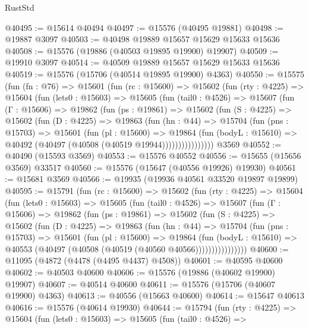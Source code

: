 \begin{lexlean}{RustStd}
\begin{coremodule}
@40495 := @15614 @40494
@40497 := @15576 (@40495 @19881)
@40498 := @19887 @3097
@40503 := @40498 @19889 @15657 @15629 @15633 @15636
@40508 := @15576 (@19886 (@40503 @19895 @19900) @19907)
@40509 := @19910 @3097
@40514 := @40509 @19889 @15657 @15629 @15633 @15636
@40519 := @15576 (@15706 (@40514 @19895 @19900) @4363)
@40550 := @15575
    (fun (fn : @76) =>
    @15601
      (fun (rc : @15600) =>
      @15602
        (fun (rty : @4225) =>
        @15604
          (fun (lets0 : @15603) =>
          @15605
            (fun (tail0 : @4526) =>
            @15607
              (fun (Γ : @15606) =>
              @19862
                (fun (ps : @19861) =>
                @15602
                  (fun (S : @4225) =>
                  @15602
                    (fun (D : @4225) =>
                    @19863
                      (fun (hn : @44) =>
                      @15704
                        (fun (pns : @15703) =>
                        @15601
                          (fun (pl : @15600) =>
                          @19864
                            (fun (bodyL : @15610) =>
                            @40492 (@40497 (@40508 (@40519 @19944))))))))))))))))
    @3569
@40552 := @40490 (@15593 @3569)
@40553 := @15576 @40552
@40556 := @15655 (@15656 @3569) @33517
@40560 := @15576 (@15647 (@40556 @19926) @19930)
@40561 := @15681 @3569
@40566 := @19935 (@19936 @40561 @33520 @19897 @19899)
@40595 := @15791
    (fun (rc : @15600) =>
    @15602
      (fun (rty : @4225) =>
      @15604
        (fun (lets0 : @15603) =>
        @15605
          (fun (tail0 : @4526) =>
          @15607
            (fun (Γ : @15606) =>
            @19862
              (fun (ps : @19861) =>
              @15602
                (fun (S : @4225) =>
                @15602
                  (fun (D : @4225) =>
                  @19863
                    (fun (hn : @44) =>
                    @15704
                      (fun (pns : @15703) =>
                      @15601
                        (fun (pl : @15600) =>
                        @19864
                          (fun (bodyL : @15610) =>
                          @40553 (@40497 (@40508 (@40519 (@40560 @40566))))))))))))))))
@40600 := @11095 (@4872 (@4478 (@4495 @4437) @4508))
@40601 := @40595 @40600
@40602 := @40503 @40600
@40606 := @15576 (@19886 (@40602 @19900) @19907)
@40607 := @40514 @40600
@40611 := @15576 (@15706 (@40607 @19900) @4363)
@40613 := @40556 (@15663 @40600)
@40614 := @15647 @40613
@40616 := @15576 (@40614 @19930)
@40644 := @15794
    (fun (rty : @4225) =>
    @15604
      (fun (lets0 : @15603) =>
      @15605
        (fun (tail0 : @4526) =>

\end{coremodule}
\end{lexlean}
